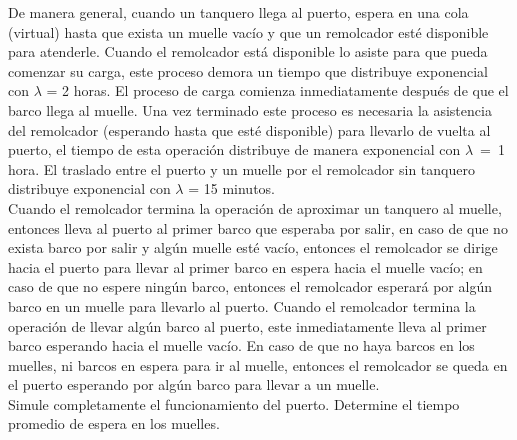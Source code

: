 \documentclass[a4paper,10pt]{article}
\begin{document}
De manera general, cuando un tanquero llega al puerto, espera en una cola (virtual) hasta que exista un muelle vacío
y que un remolcador esté disponible para atenderle. Cuando el remolcador está disponible lo asiste para que pueda
comenzar su carga, este proceso demora un tiempo que distribuye exponencial con $\lambda$ = 2 horas.
El proceso de carga comienza inmediatamente después de que el barco llega al muelle.
Una vez terminado este proceso es necesaria la asis\-tencia del remolcador (esperando hasta que esté disponible) para
llevarlo de vuelta al puerto, el tiempo de esta operación distribuye de manera exponencial con \mbox{$\lambda$ = 1}
hora. El traslado entre el puerto y un muelle por el remolcador sin tanquero distribuye exponencial con $\lambda$ = 15 minutos.\\
\hspace*{0.5cm}Cuando el remolcador termina la operación de aproximar un tanquero al muelle, entonces lleva al puerto al primer barco
que esperaba por salir, en caso de que no exista barco por salir y algún muelle esté vacío, entonces el remolcador se
dirige hacia el puerto para llevar al primer barco en espera hacia el muelle vacío; en caso de que no espere ningún barco,
entonces el remolcador esperará por algún barco en un muelle para llevarlo al puerto. Cuando el remolcador termina
la operación de llevar algún barco al puerto, este inmediatamente lleva al primer barco esperando hacia el muelle vacío.
En caso de que no haya barcos en los muelles, ni barcos en espera para ir al muelle, entonces el remolcador se queda
en el puerto esperando por algún barco para llevar a un muelle.\\
\hspace*{0.5cm}Simule completamente el funcionamiento del puerto. Determine el tiempo promedio de espera en los muelles.
\end{document}
